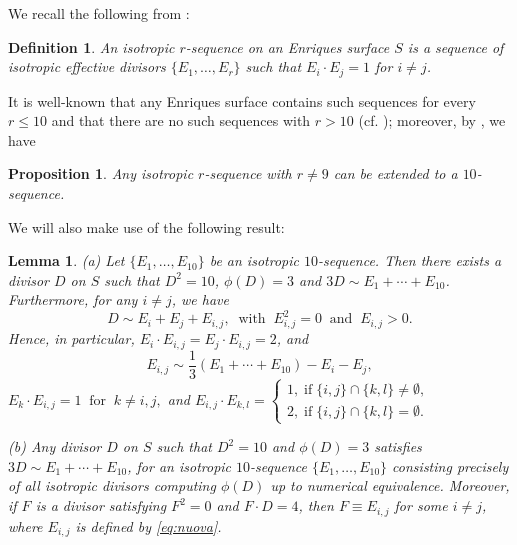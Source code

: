 \documentclass[11pt]{amsart}
\newtheorem{lemma}[thm]{Lemma}
\newtheorem{proposition}[thm]{Proposition}
\newtheorem{definition}[thm]{Definition}
\theoremstyle{definition}
\begin{document}
 We recall the following from \cite[p.~122]{cd}:

\begin{definition} \label{def:rseq}
  An {\em isotropic $r$-sequence} on an Enriques surface $S$  is a sequence of isotropic effective divisors $\{E_1, \ldots, E_r\}$  such that $E_i \cdot E_j=1$ for $i \neq j$. 
\end{definition}



It is  well-known that any Enriques surface contains such sequences for every $r \leqslant 10$ \color{black} and that there are no such sequences with $r >10$ (cf. \cite[p.~175]{cd})\color{black}; moreover, by \cite[Cor. 2.5.6]{cd},  we have

\begin{proposition} \label{prop:cd}
Any isotropic $r$-sequence with $r \neq 9$ can be extended to a $10$-sequence.
\end{proposition}


 We will  also   make use of the following result:


\begin{lemma} \label{lemma:ceraprima}
(a) Let $\{E_1,\ldots,E_{10}\}$ be an isotropic $10$-sequence. Then there exists a divisor $D$ on $S$ such that $D^2=10$, $\phi(D)=3$ and
$3D \sim E_1+\cdots+E_{10}$. Furthermore, for any $i \neq j$, we have
\begin{equation} \label{eq:10-3}
  D \sim E_i+E_j+E_{i,j},
  \; \; \mbox{with}\; \; E_{i,j}^ 2=0
  \; \; \mbox{and}\; \; 
  E_{i,j}> 0.
\end{equation} 
\color{black} Hence, in particular,
$E_i \cdot E_{i,j}=E_j \cdot E_{i,j}=2$, and
\begin{equation}
  \label{eq:nuova}
  E_{i,j} \sim \frac{1}{3}\left(E_1+\cdots+E_{10}\right)-E_i-E_j,
\end{equation}\color{black}
 $E_k \cdot E_{i,j}=1 \; \; \mbox{for} \; \; k \neq i,j,$
\color{black} and \color{black}
$E_{i,j} \cdot E_{k,l}= \begin{cases} 1, \; \mbox{if} \; \{i,j\} \cap \{k,l\} \neq \emptyset, \\
2, \; \mbox{if} \; \{i,j\} \cap \{k,l\} = \emptyset. \end{cases}$ 

(b) Any divisor $D$ on $S$ such that $D^2=10$ and $\phi(D)=3$ satisfies $3D \sim E_1+\cdots+E_{10}$, for an isotropic $10$-sequence $\{E_1,\ldots,E_{10}\}$ consisting precisely of all isotropic divisors computing $\phi(D)$ up to numerical equivalence.  Moreover, if $F$ is a divisor satisfying $F^2=0$ and $F \cdot D=4$, then $F \equiv E_{i,j}$ for some $i \neq j$, where $E_{i,j}$ is defined by \color{black} \eqref{eq:nuova}\color{black}. 
\end{lemma}
\end{document}
